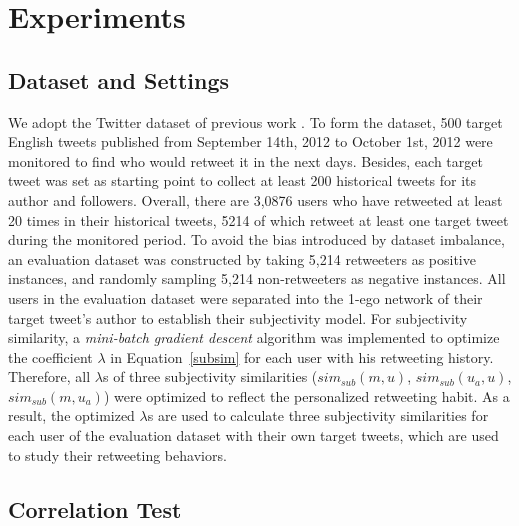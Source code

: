 \documentclass[letterpaper]{article}
\begin{document}
\section{Experiments}
\label{experiments}

\subsection{Dataset and Settings}
We adopt the Twitter dataset of previous work \cite{Luo:2013RMF}. 
To form the dataset, 500 target English tweets published from September 14th, 2012 to October 1st, 2012 were monitored to find who would retweet it in the next days. 
Besides, each target tweet was set as starting point to collect at least 200 historical tweets for its author and followers.
Overall, there are 3,0876 users who have retweeted at least 20 times in their historical tweets, 5214 of which retweet at least one target tweet during the monitored period. To avoid the bias introduced by dataset imbalance, an evaluation dataset was constructed by taking 5,214 retweeters as positive instances, and randomly sampling 5,214 non-retweeters as negative instances. All users in the evaluation dataset were separated into the 1-ego network of their target tweet's author to establish their subjectivity model. 
For subjectivity similarity, a \textit{mini-batch gradient descent} algorithm was implemented to optimize the coefficient $ \lambda $ in Equation~\ref{subsim} for each user with his retweeting history. Therefore, all $ \lambda $s of three subjectivity similarities ($ sim_{sub} \left( m,u \right) $, $ sim_{sub}\left( u_{a},u \right)  $, $ sim_{sub}\left( m,u_{a} \right)  $) were optimized to reflect the personalized retweeting habit. As a result, the optimized $ \lambda $s are used to calculate three subjectivity similarities for each user of the evaluation dataset with their own target tweets, which are used to study their retweeting behaviors.

\subsection{Correlation Test}
\end{document}
